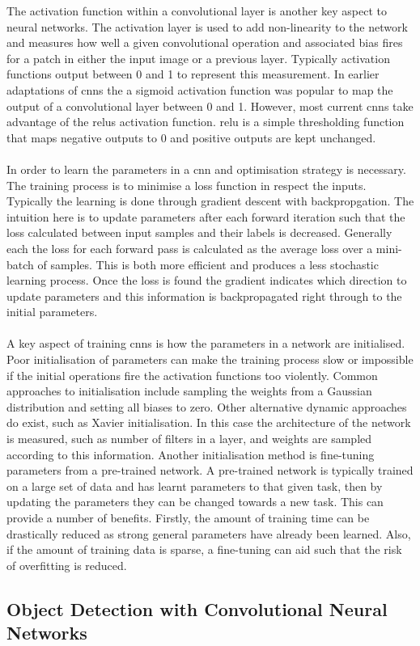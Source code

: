 The activation function within a convolutional layer is another key aspect to neural networks. The activation layer is used to add non-linearity to the network and measures how well a given convolutional operation and associated bias fires for a patch in either the input image or a previous layer. Typically activation functions output between 0 and 1 to represent this measurement. In earlier adaptations of \glspl{cnn} the a sigmoid activation function was popular to map the output of a convolutional layer between 0 and 1. However, most current \glspl{cnn} take advantage of the \glspl{relu} activation function. \gls{relu} is a simple thresholding function that maps negative outputs to 0 and positive outputs are kept unchanged.
\\\\
In order to learn the parameters in a \gls{cnn} and optimisation strategy is necessary. The training process is to minimise a loss function in respect the inputs. Typically the learning is done through gradient descent with backpropgation. The intuition here is to update parameters after each forward iteration such that the loss calculated between input samples and their labels is decreased. Generally each the loss for each forward pass is calculated as the average loss over a mini-batch of samples. This is both more efficient and produces a less stochastic learning process. Once the loss is found the gradient indicates which direction to update parameters and this information is backpropagated right through to the initial parameters.
\\\\
A key aspect of training \glspl{cnn} is how the parameters in a network are initialised. Poor initialisation of parameters can make the training process slow or impossible if the initial operations fire the activation functions too violently. Common approaches to initialisation include sampling the weights from a Gaussian distribution and setting all biases to zero. Other alternative dynamic approaches do exist, such as Xavier initialisation. In this case the architecture of the network is measured, such as number of filters in a layer, and weights are sampled according to this information. Another initialisation method is fine-tuning parameters from a pre-trained network. A pre-trained network is typically trained on a large set of data and has learnt parameters to that given task, then by updating the parameters they can be changed towards a new task. This can provide a number of benefits. Firstly, the amount of training time can be drastically reduced as strong general parameters have already been learned. Also, if the amount of training data is sparse, a fine-tuning can aid such that the risk of overfitting is reduced.

\subsection{Object Detection with Convolutional Neural Networks}

